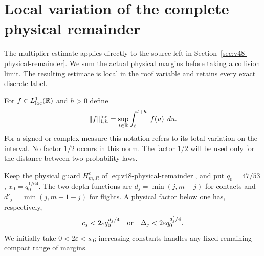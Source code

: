 \section{Local variation of the complete physical remainder}
\label{sec:v49-physical-variation}
The multiplier estimate applies directly to the source left in
Section~\ref{sec:v48-physical-remainder}. We sum the actual physical
margins before taking a collision limit. The resulting estimate is
local in the roof variable and retains every exact discrete label.

For $f\in L^1_{\rm loc}(\mathbb R)$ and $h>0$ define
\begin{equation}\label{eq:v49-local-variation-norm}
 \|f\|_{1,h}^{\rm loc}
       =\sup_{t\in\R}\int_t^{t+h}|f(u)|\,du.
\end{equation}
For a signed or complex measure this notation refers to its total
variation on the interval. No factor $1/2$ occurs in this norm.
The factor $1/2$ will be used only for the distance between two
probability laws.

Keep the physical guard $H_{m,R}^\varepsilon$ of
\eqref{eq:v48-physical-remainder}, and put
$q_0=47/53$, $x_0=q_0^{1/64}$. The two depth functions are
$d_j=\min(j,m-j)$ for contacts and
$d'_j=\min(j,m-1-j)$ for flights. A physical factor below one has,
respectively,
\[
 c_j<2\varepsilon q_0^{d_j/4}
 \quad\hbox{or}\quad
 \Delta_j<2\varepsilon q_0^{d'_j/4}.
\]
We initially take $0<2\varepsilon<s_0$; increasing constants handles
any fixed remaining compact range of margins.

